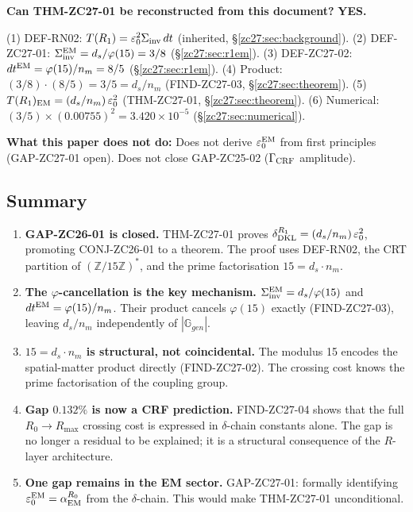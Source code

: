 \documentclass[12pt, a4paper]{article}
\begin{document}
\begin{formalbox}[title={Reconstruction Test (CUIP No-Loss)}]
\textbf{Can THM-ZC27-01 be reconstructed from this document?}
\textbf{YES.}

(1) DEF-RN02: $T(R_1) = \varepsilon_0^2\Sigma_{\rm inv}\,dt$
  (inherited, \S\ref{zc27:sec:background}).
(2) DEF-ZC27-01: $\Sigma_{\rm inv}^{\rm EM} = d_s/\varphi(15)
  = 3/8$ (\S\ref{zc27:sec:r1em}).
(3) DEF-ZC27-02: $dt^{\rm EM} = \varphi(15)/n_m = 8/5$
  (\S\ref{zc27:sec:r1em}).
(4) Product: $(3/8)\cdot(8/5) = 3/5 = d_s/n_m$
  (FIND-ZC27-03, \S\ref{zc27:sec:theorem}).
(5) $T(R_1)_{\rm EM} = (d_s/n_m)\,\varepsilon_0^2$
  (THM-ZC27-01, \S\ref{zc27:sec:theorem}).
(6) Numerical: $(3/5)\times(0.00755)^2 = 3.420\times10^{-5}$
  (\S\ref{zc27:sec:numerical}).

\textbf{What this paper does not do:}
Does not derive $\varepsilon_0^{\rm EM}$ from first principles
(GAP-ZC27-01 open).
Does not close GAP-ZC25-02 ($\Gamma_{\rm CRF}$ amplitude).
\end{formalbox}

\subsection{Summary}
\label{zc27:sec:summary}

\begin{enumerate}[leftmargin=*]

\item \textbf{GAP-ZC26-01 is closed.}
THM-ZC27-01 proves $\delta_{\rm DKL}^{R_1}
= (d_s/n_m)\,\varepsilon_0^2$, promoting CONJ-ZC26-01
to a theorem.
The proof uses DEF-RN02, the CRT partition of
$(\mathbb{Z}/15\mathbb{Z})^*$, and the prime factorisation
$15 = d_s \cdot n_m$.

\item \textbf{The $\varphi$-cancellation is the key mechanism.}
$\Sigma_{\rm inv}^{\rm EM} = d_s/\varphi(15)$
and $dt^{\rm EM} = \varphi(15)/n_m$.
Their product cancels $\varphi(15)$ exactly (FIND-ZC27-03),
leaving $d_s/n_m$ independently of $|\mathbb{G}_{gen}|$.

\item \textbf{$15 = d_s \cdot n_m$ is structural, not coincidental.}
The modulus 15 encodes the spatial-matter product directly
(FIND-ZC27-02). The crossing cost knows the prime
factorisation of the coupling group.

\item \textbf{Gap $0.132\%$ is now a CRF prediction.}
FIND-ZC27-04 shows that the full $R_0\to R_{\max}$
crossing cost is expressed in $\delta$-chain constants alone.
The gap is no longer a residual to be explained;
it is a structural consequence of the $R$-layer architecture.

\item \textbf{One gap remains in the EM sector.}
GAP-ZC27-01: formally identifying
$\varepsilon_0^{\rm EM} = \alpha_{\rm EM}^{R_0}$
from the $\delta$-chain.
This would make THM-ZC27-01 unconditional.

\end{enumerate}
\end{document}
